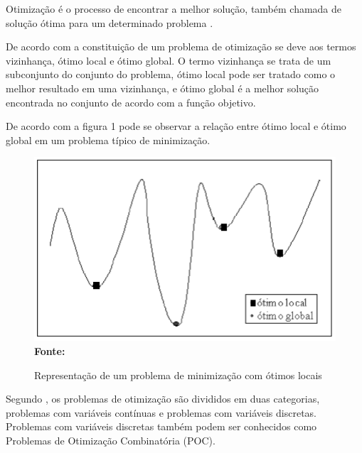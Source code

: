 

Otimização é o processo de encontrar a melhor solução, também chamada de solução ótima para um determinado problema \cite{timoteo2005desenvolvimento}.\par

De acordo com \cite{steiglitz1982combinatorial} a constituição de um problema de otimização se deve aos termos vizinhança, ótimo local e ótimo global. O termo vizinhança se trata de um subconjunto do conjunto do problema, ótimo local pode ser tratado como o melhor resultado em uma vizinhança, e ótimo global é a melhor solução encontrada no conjunto de acordo com a função objetivo.\par

De acordo com a figura 1 pode se observar a relação entre ótimo local e ótimo global em um problema típico de minimização.\par

\begin{figure}[!htb]
\caption[Representação de um problema de minimização com ótimos locais]{Representação de um problema de minimização com ótimos locais}
\label{fig:figura2}
\centering
\includegraphics[scale=0.55]{imagens/problemaOtimizacao.png}
\\ \textbf{\footnotesize Fonte: \cite{timoteo2005desenvolvimento}}
\end{figure}

Segundo \cite{steiglitz1982combinatorial}, os problemas de otimização são divididos em duas categorias, problemas com variáveis contínuas e problemas com variáveis discretas. Problemas com variáveis discretas também podem ser conhecidos como Problemas de Otimização Combinatória (POC).\par

